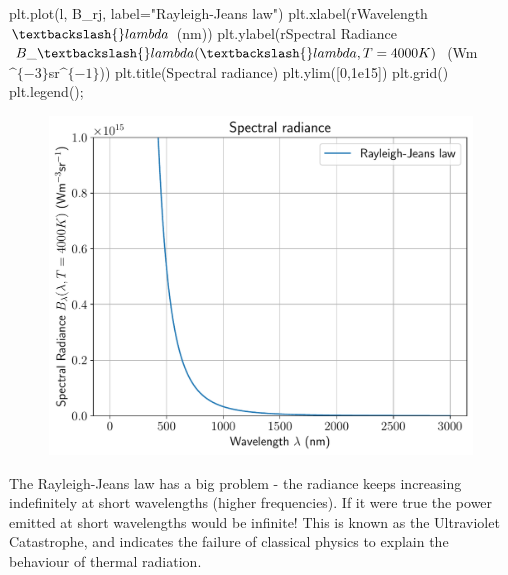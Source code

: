 \documentclass[
  letterpaper,
  DIV=11,
  numbers=noendperiod]{scrreprt}
\newenvironment{Shaded}{\begin{snugshade}}{\end{snugshade}}
\newcommand{\DecValTok}[1]{\textcolor[rgb]{0.68,0.00,0.00}{#1}}
\newcommand{\FloatTok}[1]{\textcolor[rgb]{0.68,0.00,0.00}{#1}}
\newcommand{\NormalTok}[1]{\textcolor[rgb]{0.00,0.23,0.31}{#1}}
\newcommand{\OperatorTok}[1]{\textcolor[rgb]{0.37,0.37,0.37}{#1}}
\newcommand{\StringTok}[1]{\textcolor[rgb]{0.13,0.47,0.30}{#1}}
\newcommand{\VerbatimStringTok}[1]{\textcolor[rgb]{0.13,0.47,0.30}{#1}}
\begin{document}
\begin{Shaded}
\begin{Highlighting}[]
\NormalTok{plt.plot(l, B\_rj, label}\OperatorTok{=}\StringTok{"Rayleigh{-}Jeans law"}\NormalTok{)}
\NormalTok{plt.xlabel(}\VerbatimStringTok{r\textquotesingle{}Wavelength $\textbackslash{}lambda$ (nm)\textquotesingle{}}\NormalTok{)}
\NormalTok{plt.ylabel(}\VerbatimStringTok{r\textquotesingle{}Spectral Radiance $B\_\textbackslash{}lambda(\textbackslash{}lambda, T=4000K)$ (Wm$\^{}\{{-}3\}$sr$\^{}\{{-}1\}$)\textquotesingle{}}\NormalTok{)}
\NormalTok{plt.title(}\StringTok{\textquotesingle{}Spectral radiance\textquotesingle{}}\NormalTok{)}
\NormalTok{plt.ylim([}\DecValTok{0}\NormalTok{,}\FloatTok{1e15}\NormalTok{])}
\NormalTok{plt.grid()}
\NormalTok{plt.legend()}\OperatorTok{;}
\end{Highlighting}
\end{Shaded}

\begin{figure}[H]

{\centering \includegraphics{SP1.1_-_Stellar_Properties_files/figure-pdf/cell-17-output-1.pdf}

}

\end{figure}

The Rayleigh-Jeans law has a big problem - the radiance keeps increasing
indefinitely at short wavelengths (higher frequencies). If it were true
the power emitted at short wavelengths would be infinite! This is known
as the Ultraviolet Catastrophe, and indicates the failure of classical
physics to explain the behaviour of thermal radiation.
\end{document}
